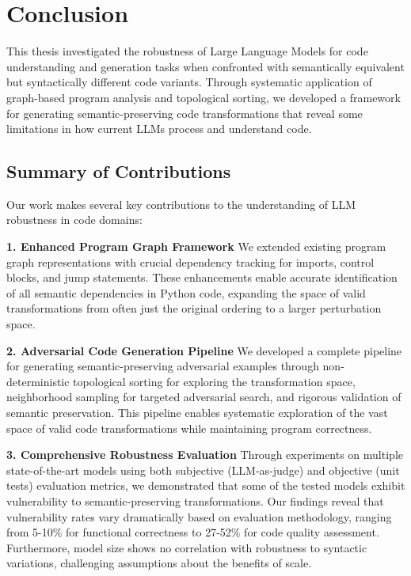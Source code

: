\documentclass[%
thesis=student,%
coverpage=false,%
titlepage=false,%
headmarks=true, %
english,%
font=libertine, %
math=newpxtx, %
BCOR=5mm,%
coverBCOR=11mm%
]{tum-templates/book/tumbook}
\begin{document}
\section{Conclusion}

This thesis investigated the robustness of Large Language Models for code understanding and generation tasks when confronted with semantically equivalent but syntactically different code variants. Through systematic application of graph-based program analysis and topological sorting, we developed a framework for generating semantic-preserving code transformations that reveal some limitations in how current LLMs process and understand code.

\subsection{Summary of Contributions}

Our work makes several key contributions to the understanding of LLM robustness in code domains:

\textbf{1. Enhanced Program Graph Framework}
We extended existing program graph representations with crucial dependency tracking for imports, control blocks, and jump statements. These enhancements enable accurate identification of all semantic dependencies in Python code, expanding the space of valid transformations from often just the original ordering to a larger perturbation space.

\textbf{2. Adversarial Code Generation Pipeline}
We developed a complete pipeline for generating semantic-preserving adversarial examples through non-deterministic topological sorting for exploring the transformation space, neighborhood sampling for targeted adversarial search, and rigorous validation of semantic preservation. This pipeline enables systematic exploration of the vast space of valid code transformations while maintaining program correctness.


\textbf{3. Comprehensive Robustness Evaluation}
Through experiments on multiple state-of-the-art models using both subjective (LLM-as-judge) and objective (unit tests) evaluation metrics, we demonstrated that some of the tested models exhibit vulnerability to semantic-preserving transformations. Our findings reveal that vulnerability rates vary dramatically based on evaluation methodology, ranging from 5-10\% for functional correctness to 27-52\% for code quality assessment. Furthermore, model size shows no correlation with robustness to syntactic variations, challenging assumptions about the benefits of scale.
\end{document}
